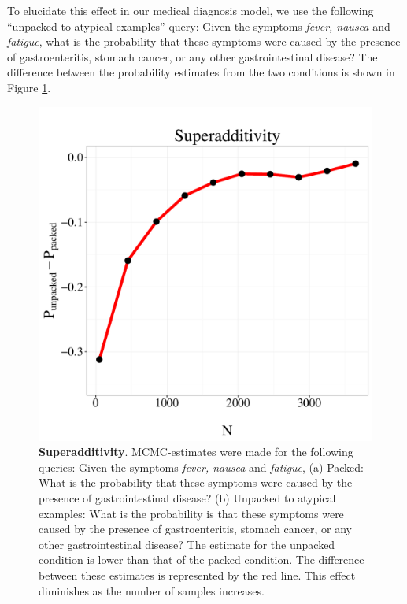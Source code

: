 To elucidate this effect in our medical diagnosis model, we use the following ``unpacked to atypical examples'' query: Given the symptoms \emph{fever, nausea} and \emph{fatigue}, what is the probability that these symptoms were caused by the presence of gastroenteritis, stomach cancer, or any other gastrointestinal disease? The difference between the probability estimates from the two conditions is shown in Figure \ref{fig:superadd}.

\begin{figure}
\centering
\includegraphics[scale = 0.5]{figures/super.pdf}
\caption{\textbf{Superadditivity}. MCMC-estimates were made for the following queries: Given the symptoms \emph{fever, nausea} and \emph{fatigue}, (a) Packed: What is the probability that these symptoms were caused by the presence of gastrointestinal disease? (b) Unpacked to atypical examples: What is the probability is that these symptoms were caused by the presence of gastroenteritis, stomach cancer, or any other gastrointestinal disease? The estimate for the unpacked condition is lower than that of the packed condition. The difference between these estimates is represented by the red line. This effect diminishes as the number of samples increases.}
\label{fig:superadd}
\end{figure}

